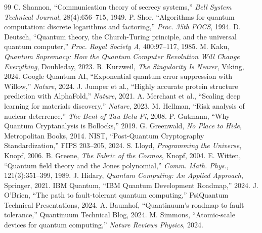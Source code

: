 \documentclass[11pt,a4paper]{article}
\begin{document}
\begin{thebibliography}{99}
 C. Shannon, ``Communication theory of secrecy systems,'' \textit{Bell System Technical Journal}, 28(4):656--715, 1949.
 P. Shor, ``Algorithms for quantum computation: discrete logarithms and factoring,'' \textit{Proc. 35th FOCS}, 1994.
 D. Deutsch, ``Quantum theory, the Church-Turing principle, and the universal quantum computer,'' \textit{Proc. Royal Society A}, 400:97--117, 1985.
 M. Kaku, \textit{Quantum Supremacy: How the Quantum Computer Revolution Will Change Everything}, Doubleday, 2023.
 R. Kurzweil, \textit{The Singularity Is Nearer}, Viking, 2024.
 Google Quantum AI, ``Exponential quantum error suppression with Willow,'' \textit{Nature}, 2024.
 J. Jumper et al., ``Highly accurate protein structure prediction with AlphaFold,'' \textit{Nature}, 2021.
 A. Merchant et al., ``Scaling deep learning for materials discovery,'' \textit{Nature}, 2023.
 M. Hellman, ``Risk analysis of nuclear deterrence,'' \textit{The Bent of Tau Beta Pi}, 2008.
 P. Gutmann, ``Why Quantum Cryptanalysis is Bollocks,'' 2019.
 G. Greenwald, \textit{No Place to Hide}, Metropolitan Books, 2014.
 NIST, ``Post-Quantum Cryptography Standardization,'' FIPS 203--205, 2024.
 S. Lloyd, \textit{Programming the Universe}, Knopf, 2006.
 B. Greene, \textit{The Fabric of the Cosmos}, Knopf, 2004.
 E. Witten, ``Quantum field theory and the Jones polynomial,'' \textit{Comm. Math. Phys.}, 121(3):351--399, 1989.
 J. Hidary, \textit{Quantum Computing: An Applied Approach}, Springer, 2021.
 IBM Quantum, ``IBM Quantum Development Roadmap,'' 2024.
 J. O'Brien, ``The path to fault-tolerant quantum computing,'' PsiQuantum Technical Presentations, 2024.
 A. Baumhof, ``Quantinuum's roadmap to fault tolerance,'' Quantinuum Technical Blog, 2024.
 M. Simmons, ``Atomic-scale devices for quantum computing,'' \textit{Nature Reviews Physics}, 2024.
\end{thebibliography}
\end{document}
